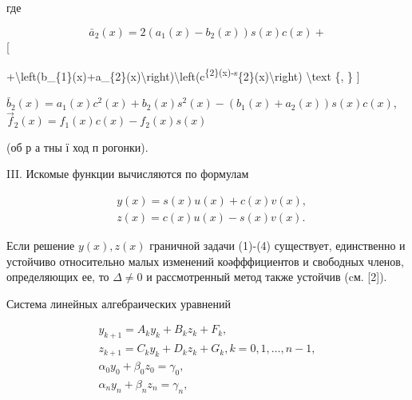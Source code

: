 \documentclass[10pt]{article}
\begin{document}
где

\[
\bar{a}_{2}(x)=2\left(a_{1}(x)-b_{2}(x)\right) s(x) c(x)+
\][

+\textbackslash left(b\_\{1\}(x)+a\_\{2\}(x)\textbackslash right)\textbackslash left(c\textsuperscript{\{2\}(x)-s}\{2\}(x)\textbackslash right) \textbackslash text \{, \}
]

$\bar{b}_{2}(x)=a_{1}(x) c^{2}(x)+b_{2}(x) s^{2}(x)-\left(b_{1}(x)+a_{2}(x)\right) s(x) c(x)$, $\vec{f}_{2}(x)=f_{1}(x) c(x)-f_{2}(x) s(x)$

(об р а тны ї ход п рогонки).

III. Искомые функции вычисляются по формулам

\[
\begin{aligned}
& y(x)=s(x) u(x)+c(x) v(x), \\
& z(x)=c(x) u(x)-s(x) v(x) .
\end{aligned}
\]

Если решение $y(x), z(x)$ граничной задачи (1)-(4) существует, единственно и устойчиво относительно малых изменений коәфффициентов и свободных членов, определяющих ее, то $\Delta \neq 0$ и рассмотренный метод также устойчив (cм. [2]).

Система линейных алгебраических уравнений

\[
\begin{gathered}
y_{k+1}=A_{k} y_{k}+B_{k} z_{k}+F_{k}, \\
z_{k+1}=C_{k} y_{k}+D_{k} z_{k}+G_{k}, k=0,1, \ldots, n-1, \\
\alpha_{0} y_{0}+\beta_{0} z_{0}=\gamma_{0}, \\
\alpha_{n} y_{n}+\beta_{n} z_{n}=\gamma_{n},
\end{gathered}
\]
\end{document}
